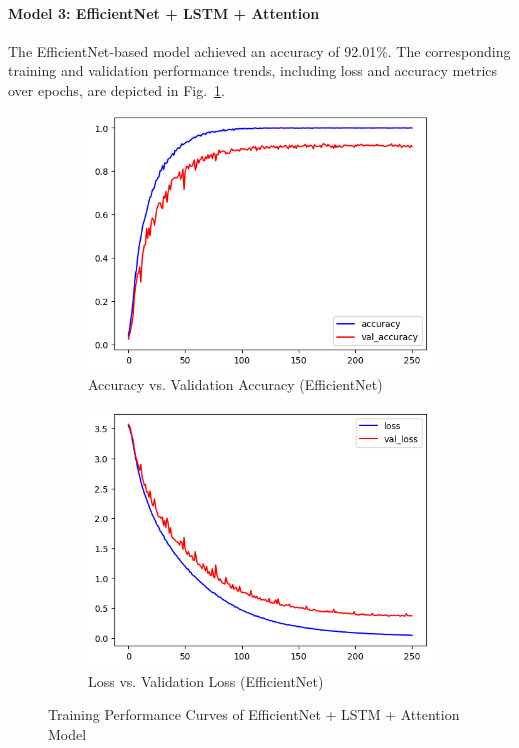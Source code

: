 \documentclass[conference]{IEEEtran}
\begin{document}
\paragraph*{Model 3: EfficientNet + LSTM + Attention}
The EfficientNet-based model achieved an accuracy of 92.01\%. The corresponding training and validation performance trends, including loss and accuracy metrics over epochs, are depicted in Fig.~\ref{fig:eff_training}. 
\begin{figure}[htbp] 
\centering 
\begin{subfigure}[b]{0.48\linewidth} \includegraphics[width=\linewidth]{eff_acc.png} \caption{Accuracy vs. Validation Accuracy (EfficientNet)} \end{subfigure} 
\hfill \begin{subfigure}[b]{0.48\linewidth} \includegraphics[width=\linewidth]{eff_loss.png} \caption{Loss vs. Validation Loss (EfficientNet)} \end{subfigure} 
\caption{Training Performance Curves of EfficientNet + LSTM + Attention Model} 
\label{fig:eff_training} \end{figure} 
\end{document}
